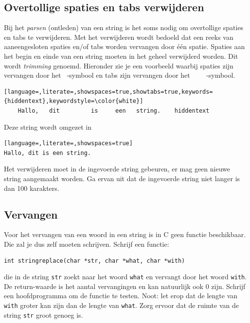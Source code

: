 \documentclass[a4paper,10pt,fleqn,twoside]{article}
\begin{document}
\subsection{Overtollige spaties en tabs verwijderen}
Bij het \textsl{parsen} (ontleden) van een string is het soms nodig om overtollige spaties en tabs te verwijderen. Met het verwijderen wordt bedoeld dat een reeks van aaneengesloten spaties en/of tabs worden vervangen door één spatie. Spaties aan het begin en einde van een string moeten in het geheel verwijderd worden. Dit wordt \textsl{trimming} genoemd. Hieronder zie je een voorbeeld waarbij spaties zijn vervangen door het \lstinline[keepspaces=true,columns=fixed,showspaces=true]| |-symbool en tabs zijn vervangen door het \lstinline[showspaces=true,showtabs=true]|	|-symbool.

\begin{lstlisting}[language=,literate=,showspaces=true,showtabs=true,keywords={hiddentext},keywordstyle=\color{white}]
    Hallo,   dit 	 	 is  	een   string.    hiddentext
\end{lstlisting}

Deze string wordt omgezet in

\begin{lstlisting}[language=,literate=,showspaces=true]
Hallo, dit is een string.
\end{lstlisting}

Het verwijderen moet in de ingevoerde string gebeuren, er mag geen nieuwe string aangemaakt worden.
Ga ervan uit dat de ingevoerde string niet langer is dan 100 karakters.

\subsection{Vervangen}
Voor het vervangen van een woord in een string is in C geen functie beschikbaar. Die zal je dus zelf moeten schrijven. Schrijf een functie:

\begin{lstlisting}
int stringreplace(char *str, char *what, char *with)
\end{lstlisting}

die in de string \lstinline|str| zoekt naar het woord \lstinline|what| en vervangt door het woord \lstinline|with|. De return-waarde is het aantal vervangingen en kan natuurlijk ook 0 zijn. Schrijf een hoofdprogramma om de functie te testen. Noot: let erop dat de lengte van \lstinline|with| groter kan zijn dan de lengte van \lstinline|what|. Zorg ervoor dat de ruimte van de string \lstinline|str| groot genoeg is.
\end{document}
